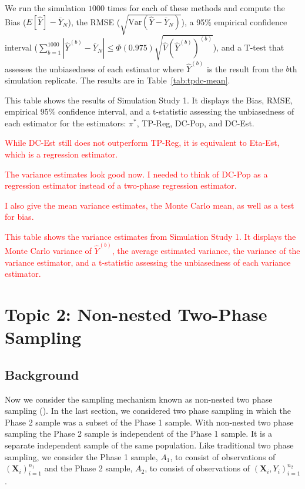 \documentclass[12pt]{article}
\newcommand{\Var}{{\text{Var}}}
\renewcommand{\bf}[1]{\mathbf{#1}}
\begin{document}
We run the simulation $1000$ times for each of these methods and compute the
Bias ($E[\hat Y] - \bar Y_N$), the RMSE ($\sqrt{\Var(\hat Y - \bar Y_N)}$), a 95\%
empirical confidence interval ($\sum_{b = 1}^{1000} |\hat Y^{(b)} - \bar Y_N| \leq 
\Phi(0.975)\sqrt{\hat V(\hat Y^{(b)})^{(b)}}$), and a T-test that assesses the
unbiasedness of each estimator where $\hat Y^{(b)}$ is the result from the $b$th
simulation replicate. The results are in Table~\ref{tab:tpdc-mean}.

\begin{table}[ht!]
  \centering

\caption{This table shows the results of Simulation Study 1. It displays the
Bias, RMSE, empirical 95\% confidence interval, and a t-statistic assessing the
unbiasedness of each estimator for the estimators: $\pi^*$, TP-Reg, DC-Pop, and
DC-Est.}
\label{tab:tpdc-mean}
\end{table}

\textcolor{red}{While DC-Est still does not outperform TP-Reg, it is equivalent
to Eta-Est, which is a regression estimator.}

\textcolor{red}{The variance estimates look good now. I needed to think of
DC-Pop as a regression estimator instead of a two-phase regression estimator.}

\textcolor{red}{I also give the mean variance estimates, the Monte Carlo mean,
as well as a test for bias.}
\begin{table}[ht!]
  \centering
{\color{red}  }
\caption{\textcolor{red}{This table shows the variance estimates from Simulation
    Study 1. It displays the Monte Carlo variance of $\hat Y^{(b)}$, the average
    estimated variance, the variance of the variance estimator, and a
    t-statistic assessing the unbiasedness of each variance estimator.}}
\label{tab:tpdc-var}
\end{table}


\section{Topic 2: Non-nested Two-Phase Sampling}

\subsection{Background}

Now we consider the sampling mechanism known as non-nested two phase sampling 
(\cite{hidiroglou2001double}). In the last section, we considered two phase sampling
in which the Phase 2 sample was a subset of the Phase 1 sample. With non-nested
two phase sampling the Phase 2 sample is independent of the Phase 1 sample. It
is a separate independent sample of the same population. Like traditional two
phase sampling, we consider the Phase 1 sample, $A_1$, to consist of
observations of $(\bf X_i)_{i = 1}^{n_1}$ and the Phase 2 sample, $A_2$, to consist
of observations of $(\bf X_i, Y_i)_{i = 1}^{n_2}$. 
\end{document}
